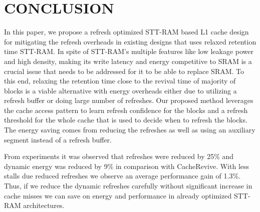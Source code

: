 \documentclass[sigconf]{acmart}
\begin{document}
\section{CONCLUSION}

In this paper, we propose a refresh optimized STT-RAM based L1 cache design for mitigating the refresh overheads in existing designs that uses relaxed retention time STT-RAM. In spite of STT-RAM's multiple features like low leakage power and high density, making its write latency and energy competitive to SRAM is a crucial issue that needs to be addressed for it to be able to replace SRAM. To this end, relaxing the retention time close to the revival time of majority of blocks is a viable alternative with energy overheads either due to utilizing a refresh buffer or doing large number of refreshes. Our proposed method leverages the cache access pattern to learn refresh confidence for the blocks and a refresh threshold for the whole cache that is used to decide when to refresh the blocks. The energy saving comes from reducing the refreshes as well as using an auxiliary segment instead of a refresh buffer.
   
From experiments it was observed that refreshes were reduced by 25\% and dynamic energy was reduced by 9\% in comparison with CacheRevive. With less stalls due reduced refreshes we observe an average performance gain of 1.3\%. Thus, if we reduce the dynamic refreshes carefully without significant increase in cache misses we can save on energy and performance in already optimized STT-RAM architectures. 













\end{document}
